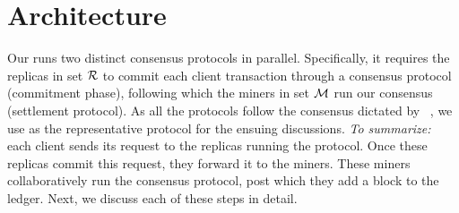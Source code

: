 \section{\DualChain{} Architecture}
\label{s:dual}
Our \DualChain{} runs two distinct consensus protocols in parallel. 
Specifically, it requires the replicas in set $\mathcal{R}{}$ to commit each client transaction
through a \BFT{} consensus protocol (commitment phase), following which the miners in set $\mathcal{M}{}$ run our \PoC{} 
consensus (settlement protocol). As all the \BFT{} protocols follow the consensus dictated by 
\pbft~\cite{pbftj}, we use \pbft{} as the representative protocol 
for the ensuing discussions.
%
{\em To summarize:} each client sends its request to the replicas running the \pbft{} protocol. 
Once these replicas commit this request, they forward it to the miners. 
These miners collaboratively run the \PoC{} consensus protocol, post 
which they add a block to the ledger. Next, we discuss each of these steps 
in detail.

